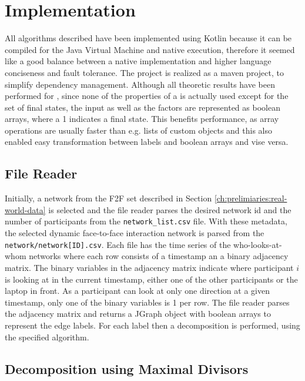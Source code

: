 \chapter{Implementation}
\label{ch:Implementation}
All algorithms described have been implemented using Kotlin because it can be compiled for the Java Virtual Machine and native execution, therefore it seemed like a good balance between a native implementation and higher language conciseness and fault tolerance.
The project is realized as a maven project, to simplify dependency management.
Although all theoretic results have been performed for \DFAs, since none of the properties of a \DFA is actually used except for the set of final states, the input as well as the factors are represented as boolean arrays, where a 1 indicates a final state.
This benefits performance, as array operations are usually faster than e.g. lists of custom objects and this also enabled easy transformation between labels and boolean arrays and vise versa. 

\section{File Reader}
\label{ch:Implementation:file-reader}
Initially, a network from the F2F set described in Section \ref{ch:prelimiaries:real-world-data} is selected and the file reader parses the desired network id and the number of participants from the \verb*|network_list.csv| file.
With these metadata, the selected dynamic face-to-face interaction network is parsed from the \verb*|network/network[ID].csv|.
Each file has the time series of the who-looks-at-whom networks where each row consists of a timestamp an a binary adjacency matrix.
The binary variables in the adjacency matrix indicate where participant $i$ is looking at in the current timestamp, either one of the other participants or the laptop in front.
As a participant can look at only one direction at a given timestamp, only one of the binary variables is 1 per row.
The file reader parses the adjacency matrix and returns a JGraph object with boolean arrays to represent the edge labels.
For each label then a decomposition is performed, using the specified algorithm.

\section{Decomposition using Maximal Divisors}
\label{ch:Implementation:max-divisor}


